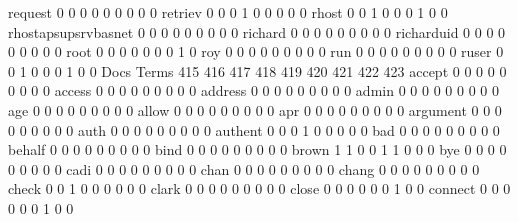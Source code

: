 \documentclass[compress,8pt]{beamer}
\begin{document}
\begin{frame}
\begin{Schunk}
  request                                    0   0   0   0   0   0   0   0   0
  retriev                                    0   0   0   1   0   0   0   0   0
  rhost                                      0   0   1   0   0   0   1   0   0
  rhostapsupsrvbasnet                        0   0   0   0   0   0   0   0   0
  richard                                    0   0   0   0   0   0   0   0   0
  richarduid                                 0   0   0   0   0   0   0   0   0
  root                                       0   0   0   0   0   0   0   1   0
  roy                                        0   0   0   0   0   0   0   0   0
  run                                        0   0   0   0   0   0   0   0   0
  ruser                                      0   0   1   0   0   0   1   0   0
                                          Docs
Terms                                      415 416 417 418 419 420 421 422 423
  accept                                     0   0   0   0   0   0   0   0   0
  access                                     0   0   0   0   0   0   0   0   0
  address                                    0   0   0   0   0   0   0   0   0
  admin                                      0   0   0   0   0   0   0   0   0
  age                                        0   0   0   0   0   0   0   0   0
  allow                                      0   0   0   0   0   0   0   0   0
  apr                                        0   0   0   0   0   0   0   0   0
  argument                                   0   0   0   0   0   0   0   0   0
  auth                                       0   0   0   0   0   0   0   0   0
  authent                                    0   0   0   1   0   0   0   0   0
  bad                                        0   0   0   0   0   0   0   0   0
  behalf                                     0   0   0   0   0   0   0   0   0
  bind                                       0   0   0   0   0   0   0   0   0
  brown                                      1   1   0   0   1   1   0   0   0
  bye                                        0   0   0   0   0   0   0   0   0
  cadi                                       0   0   0   0   0   0   0   0   0
  chan                                       0   0   0   0   0   0   0   0   0
  chang                                      0   0   0   0   0   0   0   0   0
  check                                      0   0   1   0   0   0   0   0   0
  clark                                      0   0   0   0   0   0   0   0   0
  close                                      0   0   0   0   0   0   1   0   0
  connect                                    0   0   0   0   0   0   1   0   0

\end{Schunk}
\end{frame}
\end{document}
